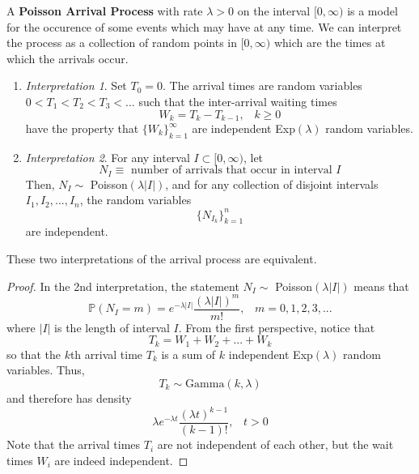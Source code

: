   A \textbf{Poisson Arrival Process} with rate $\lambda > 0$ on the interval $[0, \infty)$ is a model for the occurence of some events which may have at any time. We can interpret the process as a collection of random points in $[0, \infty)$ which are the times at which the arrivals occur. 
  \begin{enumerate}
    \item \textit{Interpretation 1}. Set $T_0 = 0$. The arrival times are random variables $0 < T_1 < T_2 < T_3 < ...$ such that the inter-arrival waiting times
    \begin{equation}
      W_k = T_k - T_{k-1}, \;\;\; k \geq 0
    \end{equation}
    have the property that $\{W_k\}_{k=1}^\infty$ are independent Exp$(\lambda)$ random variables. 

    \item \textit{Interpretation 2}. For any interval $I \subset [0, \infty)$, let 
    \begin{equation}
      N_I \equiv \text{ number of arrivals that occur in interval } I
    \end{equation}
    Then, $N_I \sim$ Poisson$(\lambda |I|)$, and for any collection of disjoint intervals $I_1, I_2, ..., I_n$, the random variables 
    \begin{equation}
      \{N_{I_k}\}_{k=1}^n
    \end{equation}
  are independent. 
  \end{enumerate}

  \begin{theorem}
    These two interpretations of the arrival process are equivalent. 
  \end{theorem}
  \begin{proof}
    In the 2nd interpretation, the statement $N_I \sim$ Poisson$(\lambda |I|)$ means that 
    \begin{equation}
      \mathbb{P}(N_I = m) = e^{-\lambda |I|} \frac{(\lambda |I|)^m}{m!}, \;\;\; m = 0, 1, 2, 3, ...
    \end{equation}
    where $|I|$ is the length of interval $I$. From the first perspective, notice that 
    \begin{equation}
      T_k = W_1 + W_2 + ... + W_k
    \end{equation}
    so that the $k$th arrival time $T_k$ is a sum of $k$ independent Exp$(\lambda)$ random variables. Thus, 
    \begin{equation}
      T_k \sim \text{Gamma}(k, \lambda)
    \end{equation}
    and therefore has density
    \begin{equation}
    \lambda e^{-\lambda t} \frac{(\lambda t)^{k-1}}{(k-1)!}, \;\;\; t>0
    \end{equation}
    Note that the arrival times $T_i$ are not independent of each other, but the wait times $W_i$ are indeed independent. 
  \end{proof}

